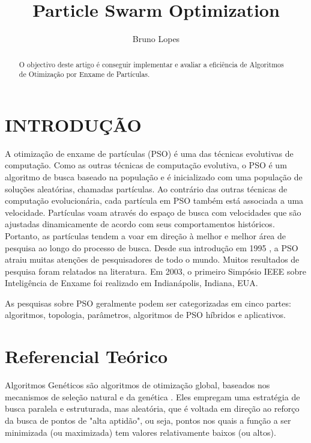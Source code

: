 \documentclass[conference]{IEEEtran}
\begin{document}
\title{Particle Swarm Optimization}

\author{Bruno Lopes}
\maketitle

\begin{abstract}
O objectivo deste artigo é conseguir implementar e avaliar a eficiência de Algoritmos de Otimização por Enxame de Partículas.

\end{abstract}

\section{INTRODUÇÃO}
	A otimização de enxame de partículas (PSO) é uma das técnicas evolutivas de computação. Como as outras técnicas de computação evolutiva, o PSO é um algoritmo de busca baseado na população e é inicializado com uma população de soluções aleatórias, chamadas partículas. Ao contrário das outras técnicas de computação evolucionária, cada partícula em PSO também está associada a uma velocidade. Partículas voam através do espaço de busca com velocidades que são ajustadas dinamicamente de acordo com seus comportamentos históricos. Portanto, as partículas tendem a voar em direção à melhor e melhor área de pesquisa ao longo do processo de busca. Desde sua introdução em 1995 \cite{b1}, a PSO atraiu muitas atenções de pesquisadores de todo o mundo. Muitos resultados de pesquisa foram relatados na literatura. Em 2003, o primeiro Simpósio IEEE sobre Inteligência de Enxame foi realizado em Indianápolis, Indiana, EUA. 
		
	As pesquisas sobre PSO geralmente podem ser categorizadas em cinco partes: algoritmos, topologia, parâmetros, algoritmos de PSO híbridos e aplicativos.

\section{Referencial Teórico}

Algoritmos Genéticos são algoritmos de otimização global, baseados nos mecanismos de seleção natural e da genética \cite{b2}. Eles empregam uma estratégia de busca paralela e estruturada, mas aleatória, que é voltada em direção ao reforço da busca de pontos de "alta aptidão", ou seja, pontos nos quais a função a ser minimizada (ou maximizada) tem valores relativamente baixos (ou altos).
\end{document}
